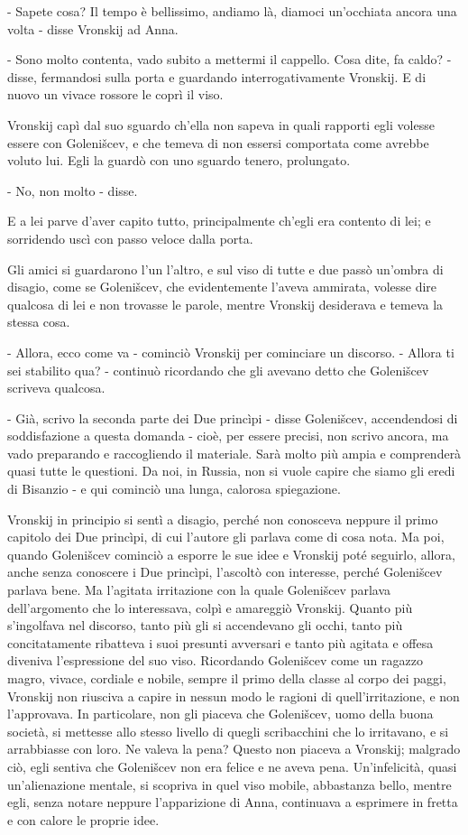 - Sapete cosa? Il tempo è bellissimo, andiamo là, diamoci un'occhiata ancora una volta - disse Vronskij ad Anna. 

- Sono molto contenta, vado subito a mettermi il cappello. Cosa dite, fa caldo? - disse, fermandosi sulla porta e guardando interrogativamente Vronskij. E di nuovo un vivace rossore le coprì il viso. 

Vronskij capì dal suo sguardo ch'ella non sapeva in quali rapporti egli volesse essere con Golenišcev, e che temeva di non essersi comportata come avrebbe voluto lui. Egli la guardò con uno sguardo tenero, prolungato. 

- No, non molto - disse. 

E a lei parve d'aver capito tutto, principalmente ch'egli era contento di lei; e sorridendo uscì con passo veloce dalla porta. 

Gli amici si guardarono l'un l'altro, e sul viso di tutte e due passò un'ombra di disagio, come se Golenišcev, che evidentemente l'aveva ammirata, volesse dire qualcosa di lei e non trovasse le parole, mentre Vronskij desiderava e temeva la stessa cosa. 

- Allora, ecco come va - cominciò Vronskij per cominciare un discorso. - Allora ti sei stabilito qua? - continuò ricordando che gli avevano detto che Golenišcev scriveva qualcosa. 

- Già, scrivo la seconda parte dei Due princìpi - disse Golenišcev, accendendosi di soddisfazione a questa domanda - cioè, per essere precisi, non scrivo ancora, ma vado preparando e raccogliendo il materiale. Sarà molto più ampia e comprenderà quasi tutte le questioni. Da noi, in Russia, non si vuole capire che siamo gli eredi di Bisanzio - e qui cominciò una lunga, calorosa spiegazione. 

Vronskij in principio si sentì a disagio, perché non conosceva neppure il primo capitolo dei Due princìpi, di cui l'autore gli parlava come di cosa nota. Ma poi, quando Golenišcev cominciò a esporre le sue idee e Vronskij poté seguirlo, allora, anche senza conoscere i Due princìpi, l'ascoltò con interesse, perché Golenišcev parlava bene. Ma l'agitata irritazione con la quale Golenišcev parlava dell'argomento che lo interessava, colpì e amareggiò Vronskij. Quanto più s'ingolfava nel discorso, tanto più gli si accendevano gli occhi, tanto più concitatamente ribatteva i suoi presunti avversari e tanto più agitata e offesa diveniva l'espressione del suo viso. Ricordando Golenišcev come un ragazzo magro, vivace, cordiale e nobile, sempre il primo della classe al corpo dei paggi, Vronskij non riusciva a capire in nessun modo le ragioni di quell'irritazione, e non l'approvava. In particolare, non gli piaceva che Golenišcev, uomo della buona società, si mettesse allo stesso livello di quegli scribacchini che lo irritavano, e si arrabbiasse con loro. Ne valeva la pena? Questo non piaceva a Vronskij; malgrado ciò, egli sentiva che Golenišcev non era felice e ne aveva pena. Un'infelicità, quasi un'alienazione mentale, si scopriva in quel viso mobile, abbastanza bello, mentre egli, senza notare neppure l'apparizione di Anna, continuava a esprimere in fretta e con calore le proprie idee. 

